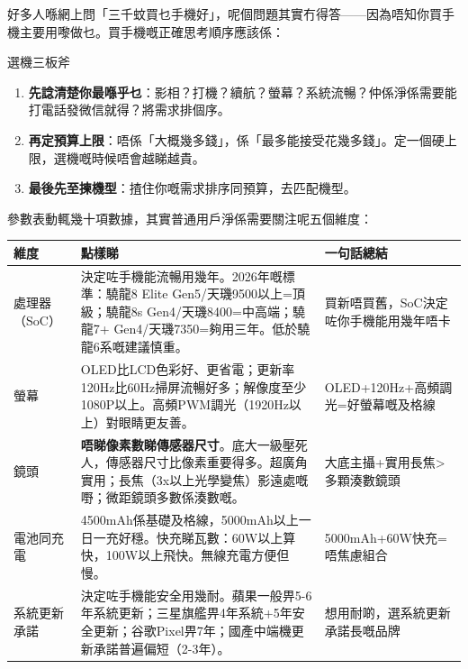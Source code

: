


好多人喺網上問「三千蚊買乜手機好」，呢個問題其實冇得答——因為唔知你買手機主要用嚟做乜。買手機嘅正確思考順序應該係：

\begin{tcbinfo}{選機三板斧}
\begin{enumerate}
  \item \textbf{先諗清楚你最喺乎乜}：影相？打機？續航？螢幕？系統流暢？仲係淨係需要能打電話發微信就得？將需求排個序。
  \item \textbf{再定預算上限}：唔係「大概幾多錢」，係「最多能接受花幾多錢」。定一個硬上限，選機嘅時候唔會越睇越貴。
  \item \textbf{最後先至揀機型}：揸住你嘅需求排序同預算，去匹配機型。
\end{enumerate}

\end{tcbinfo}


參數表動輒幾十項數據，其實普通用戶淨係需要關注呢五個維度：

\begin{center}
\begin{tabularx}{\linewidth}{|X|X|X|}
\hline
\textbf{維度} & \textbf{點樣睇} & \textbf{一句話總結} \tabularnewline
\hline
處理器（SoC） & 決定咗手機能流暢用幾年。2026年嘅標準：驍龍8 Elite Gen5/天璣9500以上=頂級；驍龍8s Gen4/天璣8400=中高端；驍龍7+ Gen4/天璣7350=夠用三年。低於驍龍6系嘅建議慎重。 & 買新唔買舊，SoC決定咗你手機能用幾年唔卡 \tabularnewline
螢幕 & OLED比LCD色彩好、更省電；更新率120Hz比60Hz掃屏流暢好多；解像度至少1080P以上。高頻PWM調光（1920Hz以上）對眼睛更友善。 & OLED+120Hz+高頻調光=好螢幕嘅及格線 \tabularnewline
鏡頭 & \textbf{唔睇像素數睇傳感器尺寸}。底大一級壓死人，傳感器尺寸比像素重要得多。超廣角實用；長焦（3x以上光學變焦）影遠處嘅嘢；微距鏡頭多數係湊數嘅。 & 大底主攝+實用長焦>多顆湊數鏡頭 \tabularnewline
電池同充電 & 4500mAh係基礎及格線，5000mAh以上一日一充好穩。快充睇瓦數：60W以上算快，100W以上飛快。無線充電方便但慢。 & 5000mAh+60W快充=唔焦慮組合 \tabularnewline
系統更新承諾 & 決定咗手機能安全用幾耐。蘋果一般畀5-6年系統更新；三星旗艦畀4年系統+5年安全更新；谷歌Pixel畀7年；國產中端機更新承諾普遍偏短（2-3年）。 & 想用耐啲，選系統更新承諾長嘅品牌 \tabularnewline
\hline
\end{tabularx}
\end{center}

